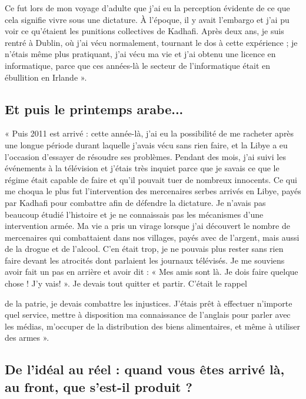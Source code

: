 Ce fut lors de mon voyage d'adulte que j'ai eu la perception évidente de
ce que cela signifie vivre sous une dictature. À l'époque, il y avait
l'embargo et j'ai pu voir ce qu'étaient les punitions collectives de
Kadhafi. Après deux ans, je suis rentré à Dublin, où j'ai vécu
normalement, tournant le dos à cette expérience ; je n'étais même plus
pratiquant, j'ai vécu ma vie et j'ai obtenu une licence en informatique,
parce que ces années-là le secteur de l'informatique était en ébullition
en Irlande ».

\hypertarget{et-puis-le-printemps-arabe...}{%
\subsection{Et puis le printemps
arabe...}\label{et-puis-le-printemps-arabe...}}

« Puis 2011 est arrivé : cette année-là, j'ai eu la possibilité de me
racheter après une longue période durant laquelle j'avais vécu sans rien
faire, et la Libye a eu l'occasion d'essayer de résoudre ses problèmes.
Pendant des mois, j'ai suivi les événements à la télévision et j'étais
très inquiet parce que je savais ce que le régime était capable de faire
et qu'il pouvait tuer de nombreux innocents. Ce qui me choqua le plus
fut l'intervention des mercenaires serbes arrivés en Libye, payés par
Kadhafi pour combattre afin de défendre la dictature. Je n'avais pas
beaucoup étudié l'histoire et je ne connaissais pas les mécanismes d'une
intervention armée. Ma vie a pris un virage lorsque j'ai découvert le
nombre de mercenaires qui combattaient dans nos villages, payés avec de
l'argent, mais aussi de la drogue et de l'alcool. C'en était trop, je ne
pouvais plus rester sans rien faire devant les atrocités dont parlaient
les journaux télévisés. Je me souviens avoir fait un pas en arrière et
avoir dit : « Mes amis sont là. Je dois faire quelque chose ! J'y vais!
». Je devais tout quitter et partir. C'était le rappel

de la patrie, je devais combattre les injustices. J'étais prêt à
effectuer n'importe quel service, mettre à disposition ma connaissance
de l'anglais pour parler avec les médias, m'occuper de la distribution
des biens alimentaires, et même à utiliser des armes ».

\hypertarget{de-liduxe9al-au-ruxe9el-quand-vous-uxeates-arrivuxe9-luxe0-au-front-que-sest-il-produit}{%
\subsection{De l'idéal au réel : quand vous êtes arrivé là, au front, que
s'est-il produit
?}\label{de-liduxe9al-au-ruxe9el-quand-vous-uxeates-arrivuxe9-luxe0-au-front-que-sest-il-produit}}


